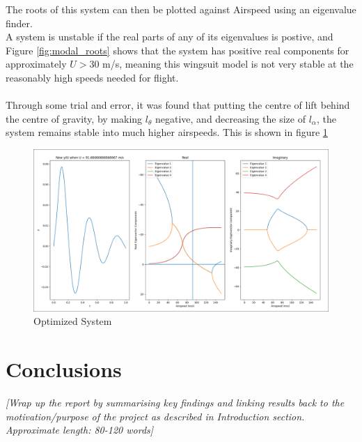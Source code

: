 \documentclass[11pt]{article}
\begin{document}
The roots of this system can then be plotted against Airspeed using an eigenvalue finder. \\
A system is unstable if the real parts of any of its eigenvalues is postive, and Figure \ref{fig:modal_roots} shows that the system has positive real components for approximately $U > 30$ m/s, meaning this wingsuit model is not very stable at the reasonably high speeds needed for flight.
\\\\
Through some trial and error, it was found that putting the centre of lift behind the centre of gravity, by making $l_{\theta}$ negative, and decreasing the size of $l_{\alpha}$, the system remains stable into much higher airspeeds. This is shown in figure \ref{fig:optimized_system}

\begin{figure}
  \centering
  \includegraphics[width=170mm, trim=3 3 3 3, clip]{optimized_system.png}
  \caption{Optimized System}\label{fig:optimized_system}
\end{figure}

\section*{Conclusions}\label{sec:conclusion}
\textcolor[rgb]{0.80,0.29,0.09}{\textsl{[Wrap up the report by summarising key findings and linking results back to the motivation/purpose of the project as described in Introduction section. Approximate length: 80-120 words]}}


{}

\end{document}

